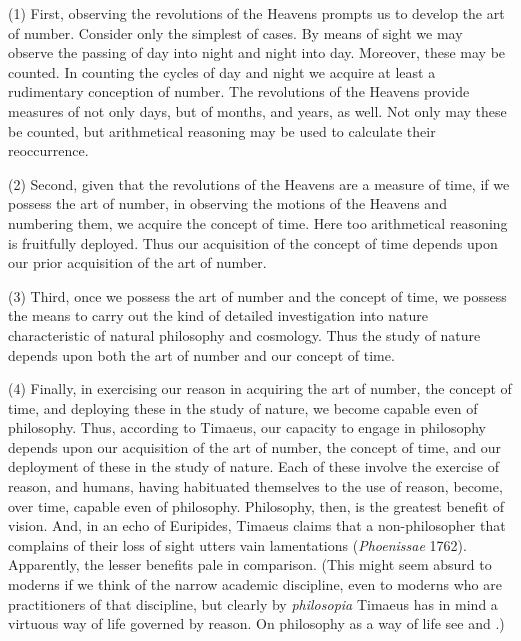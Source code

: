 (1) First, observing the revolutions of the Heavens prompts us to develop the art of number. Consider only the simplest of cases. By means of sight we may observe the passing of day into night and night into day. Moreover, these may be counted. In counting the cycles of day and night we acquire at least a rudimentary conception of number. The revolutions of the Heavens provide measures of not only days, but of months, and years, as well. Not only may these be counted, but arithmetical reasoning may be used to calculate their reoccurrence. 

(2) Second, given that the revolutions of the Heavens are a measure of time, if we possess the art of number, in observing the motions of the Heavens and numbering them, we acquire the concept of time. Here too arithmetical reasoning is fruitfully deployed. Thus our acquisition of the concept of time depends upon our prior acquisition of the art of number.

(3) Third, once we possess the art of number and the concept of time, we possess the means to carry out the kind of detailed investigation into nature characteristic of natural philosophy and cosmology. Thus the study of nature depends upon both the art of number and our concept of time.

(4) Finally, in exercising our reason in acquiring the art of number, the concept of time, and deploying these in the study of nature, we become capable even of philosophy. Thus, according to Timaeus, our capacity to engage in philosophy depends upon our acquisition of the art of number, the concept of time, and our deployment of these in the study of nature. Each of these involve the exercise of reason, and humans, having habituated themselves to the use of reason, become, over time, capable even of philosophy. Philosophy, then, is the greatest benefit of vision. And, in an echo of Euripides, Timaeus claims that a non-philosopher that complains of their loss of sight utters vain lamentations (\emph{Phoenissae} 1762). Apparently, the lesser benefits pale in comparison. (This might seem absurd to moderns if we think of the narrow academic discipline, even to moderns who are practitioners of that discipline, but clearly by \emph{philosopia} Timaeus has in mind a virtuous way of life governed by reason. On philosophy as a way of life see \citealt{Hadot:1997aa,Hadot:2002aa} and \citealt{Cooper:2012aa}.)

